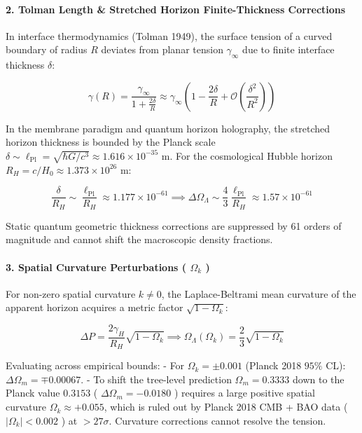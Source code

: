 \documentclass[11pt,a4paper]{article}
\theoremstyle{definition}\newtheorem{definition}{Definition}
\theoremstyle{remark}\newtheorem{remark}{Remark}
\begin{document}
\paragraph{2. Tolman Length \& Stretched Horizon Finite-Thickness Corrections}

In interface thermodynamics (Tolman 1949), the surface tension of a curved boundary of radius $R$ deviates from planar tension $\gamma_\infty$ due to finite interface thickness $\delta$:


\begin{equation}
\gamma(R) = \frac{\gamma_\infty}{1 + \frac{2\delta}{R}} \approx \gamma_\infty \left(1 - \frac{2\delta}{R} + \mathcal{O}\left(\frac{\delta^2}{R^2}\right)\right)
\end{equation}


In the membrane paradigm and quantum horizon holography, the stretched horizon thickness is bounded by the Planck scale $\delta \sim \ell_{\text{Pl}} = \sqrt{\hbar G / c^3} \approx 1.616 \times 10^{-35}\text{ m}$. For the cosmological Hubble horizon $R_H = c/H_0 \approx 1.373 \times 10^{26}\text{ m}$:


\begin{equation}
\frac{\delta}{R_H} \sim \frac{\ell_{\text{Pl}}}{R_H} \approx 1.177 \times 10^{-61} \implies \Delta\Omega_\Lambda \sim \frac{4}{3}\frac{\ell_{\text{Pl}}}{R_H} \approx 1.57 \times 10^{-61}
\end{equation}


Static quantum geometric thickness corrections are suppressed by 61 orders of magnitude and cannot shift the macroscopic density fractions.
\paragraph{3. Spatial Curvature Perturbations ( $\Omega_k$ )}

For non-zero spatial curvature $k \neq 0$, the Laplace-Beltrami mean curvature of the apparent horizon acquires a metric factor $\sqrt{1 - \Omega_k}$:


\begin{equation}
\Delta P = \frac{2\gamma_H}{R_H}\sqrt{1 - \Omega_k} \implies \Omega_\Lambda(\Omega_k) = \frac{2}{3}\sqrt{1 - \Omega_k}
\end{equation}


Evaluating across empirical bounds:
- For $\Omega_k = \pm 0.001$ (Planck 2018 $95\%$ CL): $\Delta\Omega_m = \mp 0.00067$.
- To shift the tree-level prediction $\Omega_m = 0.3333$ down to the Planck value $0.3153$ ( $\Delta\Omega_m = -0.0180$ ) requires a large positive spatial curvature $\Omega_k \approx +0.055$, which is ruled out by Planck 2018 CMB + BAO data ( $|\Omega_k| < 0.002$ ) at $> 27\sigma$. Curvature corrections cannot resolve the tension.
\end{document}
